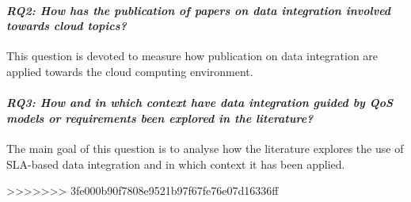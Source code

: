 \paragraph{ \textit{\textbf{RQ2:} How has the publication of papers on data
 integration involved towards cloud topics?}} This question is devoted to
 measure how publication on data integration are applied towards the cloud computing
environment.

\paragraph{\textit{\textbf{RQ3:} How and in which context have data integration
guided by QoS models or requirements been explored in the literature?}} The main
goal of this question is to analyse how the literature explores the use of
SLA-based data integration and in which context it has been applied.




>>>>>>> 3fe000b90f7808e9521b97f67fe76e07d16336ff
